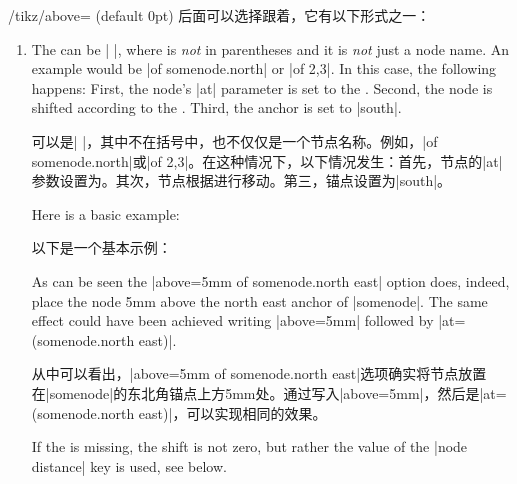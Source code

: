 \begin{key}{/tikz/above= (default 0pt)}
    后面可以选择跟着，它有以下形式之一：


    \begin{enumerate}
        \item The  can be
            | |, where  is
            \emph{not} in parentheses and it is \emph{not} just a node name. An
            example would be |of somenode.north| or |of {2,3}|. In this case, the
            following happens: First, the node's |at| parameter is set to the
            . Second, the node is shifted according to the
            . Third, the anchor is set to |south|.

            可以是| |，其中不在括号中，也不仅仅是一个节点名称。例如，|of somenode.north|或|of {2,3}|。在这种情况下，以下情况发生：首先，节点的|at|参数设置为。其次，节点根据进行移动。第三，锚点设置为|south|。



            Here is a basic example:

            以下是一个基本示例：
\begin{codeexample}[preamble={\usetikzlibrary{positioning}}]
\end{codeexample}
            As can be seen the |above=5mm of somenode.north east| option does,
            indeed, place the node 5mm above the north east anchor of
            |somenode|. The same effect could have been achieved writing
            |above=5mm| followed by |at=(somenode.north east)|.

            从中可以看出，|above=5mm of somenode.north east|选项确实将节点放置在|somenode|的东北角锚点上方5mm处。通过写入|above=5mm|，然后是|at=(somenode.north east)|，可以实现相同的效果。

            If the  is missing, the shift is not zero, but
            rather the value of the |node distance| key is used, see below.


\end{enumerate}
\end{key}
